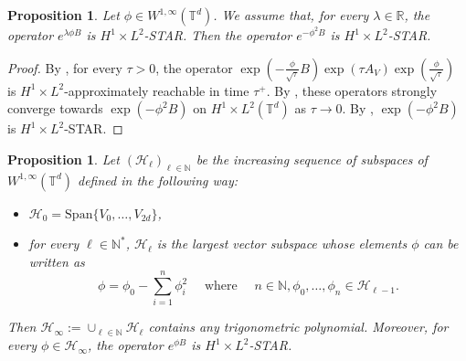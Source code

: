 \documentclass[a4paper]{article}
\theoremstyle{plain}
\newtheorem{proposition}[theorem]{Proposition}
\newcommand{\T}{\mathbb{T}}
\newcommand{\R}{\mathbb{R}}
\begin{document}
\begin{proposition} \label{Lem:psi_iter}
Let $\phi \in W^{1,\infty}(\T^d)$.
We assume that, for every $\lambda \in \R$, the operator $e^{\lambda \phi B}$ is $H^1 \times L^2$-STAR. Then the operator $e^{-\phi^2 B}$ is $H^1 \times L^2$-STAR.
\end{proposition} 

\begin{proof}
By , for every $\tau>0$, the operator 
$\exp(-\frac{\phi}{\sqrt{\tau}}B) \exp(\tau A_V) \exp( \frac{\phi}{\sqrt{\tau}})$ is $H^1 \times L^2$-approximately reachable in time $\tau^+$. By , these operators strongly converge towards $\exp(-\phi^2 B)$ on $H^1 \times L^2(\T^d)$ as $\tau \to 0$. By , $\exp(-\phi^2 B)$ is $H^1 \times L^2$-STAR.
\end{proof}

\begin{proposition} \label{Lem:H}
Let $(\mathcal{H}_{\ell})_{\ell\in\mathbb{N}}$ be the increasing sequence of subspaces of $W^{1,\infty}(\T^d)$ defined in the following way:
\begin{itemize}[topsep=0cm, parsep=0cm, itemsep=0cm]
    \item $\mathcal{H}_0=\text{Span}\{V_0,\dots,V_{2d}\}$,
    \item for every $\ell \in \mathbb{N}^*$, $\mathcal{H}_{\ell}$ is the largest vector subspace whose elements $\phi$ can be written as
    \begin{equation} \label{dec:phi}
    \phi=\phi_0 - \sum_{i=1}^n \phi_i^2 \quad  \text{ where }  \quad
    n \in\mathbb{N}, \phi_0,\dots,\phi_n \in\mathcal{H}_{\ell-1}.
    \end{equation}
\end{itemize}
   Then $\mathcal{H}_{\infty}:=\cup_{\ell \in\mathbb{N}} \mathcal{H}_{\ell}$ 
   contains any trigonometric polynomial. Moreover, for every $\phi \in \mathcal{H}_{\infty}$, the operator $e^{\phi B}$ is $H^1 \times L^2$-STAR.
\end{proposition}
\end{document}
